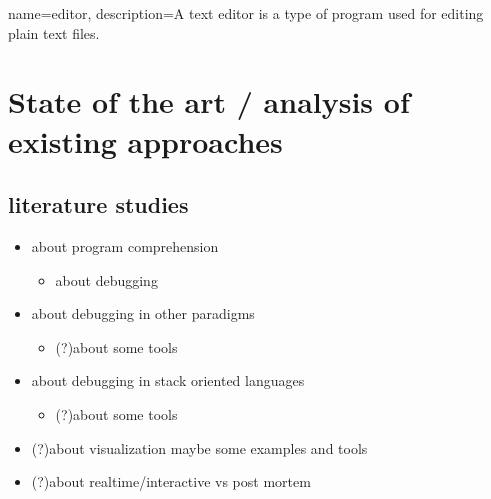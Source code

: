 %
%
%
%



{
  name={editor},
  description={A text editor is a type of program used for editing plain text files.}
}

\chapter{State of the art / analysis of existing approaches}

\section{literature studies}

\begin{itemize}
\item about program comprehension
\begin{itemize} \item about debugging \end{itemize}
\item about debugging in other paradigms
\begin{itemize} \item (?)about some tools \end{itemize}
\item about debugging in stack oriented languages
\begin{itemize} \item (?)about some tools \end{itemize}
\item (?)about visualization maybe some examples and tools
\item (?)about realtime/interactive vs post mortem
\end{itemize}

